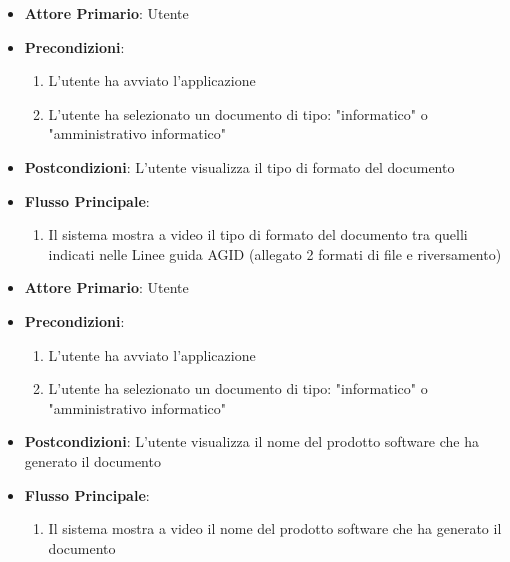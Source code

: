 \begin{itemize}
    \item \textbf{Attore Primario}: Utente
    \item \textbf{Precondizioni}:
    \begin{enumerate}
        \item L'utente ha avviato l'applicazione
        \item L'utente ha selezionato un documento di tipo: "informatico" o "amministrativo informatico"
    \end{enumerate}
    \item \textbf{Postcondizioni}: L'utente visualizza il tipo di formato del documento
    \item \textbf{Flusso Principale}: 
    \begin{enumerate} 
        \item Il sistema mostra a video il tipo di formato del documento tra quelli indicati nelle Linee guida AGID (allegato 2 formati di file e riversamento)
    \end{enumerate}
\end{itemize}

\begin{itemize}
    \item \textbf{Attore Primario}: Utente
    \item \textbf{Precondizioni}:
    \begin{enumerate}
        \item L'utente ha avviato l'applicazione
        \item L'utente ha selezionato un documento di tipo: "informatico" o "amministrativo informatico"
    \end{enumerate}
    \item \textbf{Postcondizioni}: L'utente visualizza il nome del prodotto software che ha generato il documento
    \item \textbf{Flusso Principale}:
        \begin{enumerate}
         \item Il sistema mostra a video il nome del prodotto software che ha generato il documento
    \end{enumerate}
\end{itemize}

